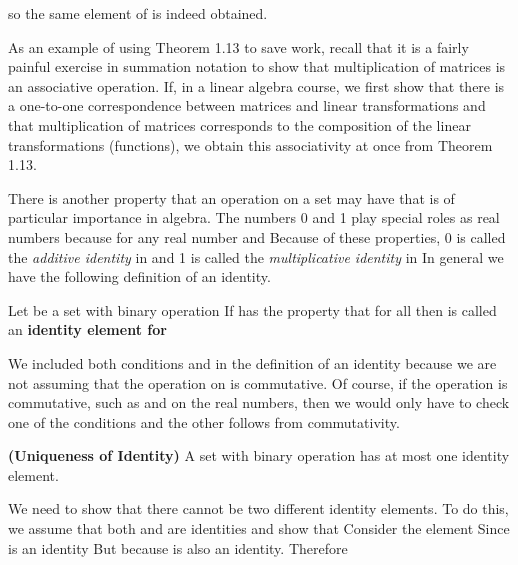 \documentclass[11pt,oneside]{article}
\begin{document}
\begin{BookBody}
\noindent so the same element  of  is indeed obtained. \BookEnd{\blacklozenge}

As an example of using Theorem 1.13 to save work, recall that it is a fairly painful exercise in summation notation to show that multiplication of  matrices is an associative operation. If, in a linear algebra course, we first show that there is a one-to-one correspondence between matrices and linear transformations and that multiplication of matrices corresponds to the composition of the linear transformations (functions), we obtain this associativity at once from Theorem 1.13.

There is another property that an operation on a set may have that is of particular importance in algebra. The numbers 0 and 1 play special roles as real numbers because for any real number  and  Because of these properties, 0 is called the\textit{ additive identity} in  and 1 is called the\textit{ multiplicative identity} in  In general we have the following definition of an identity.

 Let  be a set with binary operation  If  has the property that for all   then  is called an\textbf{ identity element for} \BookEnd{\blacksquare}

\noindent We included both conditions  and  in the definition of an identity because we are not assuming that the operation on  is commutative. Of course, if the operation is commutative, such as \BookInline{+ } and \BookInline{\times } on the real numbers, then we would only have to check one of the conditions and the other follows from commutativity.

 \textbf{(Uniqueness of Identity)} A set with binary operation \BookInline{\ast } has at most one identity element.

 We need to show that there cannot be two different identity elements. To do this, we assume that both  and  are identities and show that  Consider the element  Since  is an identity But  because  is also an identity. Therefore \BookEnd{\blacklozenge}


\end{BookBody}
\end{document}
